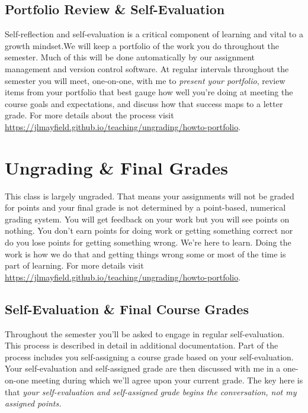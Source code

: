 \documentclass[10pt]{article}
\begin{document}
\subsection*{Portfolio Review \& Self-Evaluation}

Self-reflection and self-evaluation is a critical component of learning and vital to a growth mindset.We will keep a portfolio of the work you do throughout the semester. Much of this will be done automatically by our assignment management and version control software. At regular intervals throughout the semester you will meet, one-on-one, with me to \textit{present your portfolio}, review items from your portfolio that best gauge how well you're doing at meeting the course goals and expectations, and discuss how that success maps to a letter grade. For more details about the process visit \url{https://jlmayfield.github.io/teaching/ungrading/howto-portfolio}.



\section{Ungrading \& Final Grades}

This class is largely ungraded. That means your assignments will not be graded for points and your final grade
is not determined by a point-based, numerical grading system. You will get feedback on your work but you will
see points on nothing. You don't earn points for doing work or getting something correct nor do you lose points
for getting something wrong. We're here to learn. Doing the work is how we do that and getting things wrong
some or most of the time is part of learning. For more details visit \url{https://jlmayfield.github.io/teaching/ungrading/howto-portfolio}.

\subsection{Self-Evaluation \& Final Course Grades}

Throughout the semester you'll be asked to engage in regular self-evaluation. This process is described in
detail in additional documentation. Part of the process includes you self-assigning a course grade based on
your self-evaluation. Your self-evaluation and self-assigned grade are then discussed with me in a one-on-one
meeting during which we'll agree upon your current grade. The key here is that \textit{your self-evaluation
and self-assigned grade begins the conversation, not my assigned points.}
\end{document}
